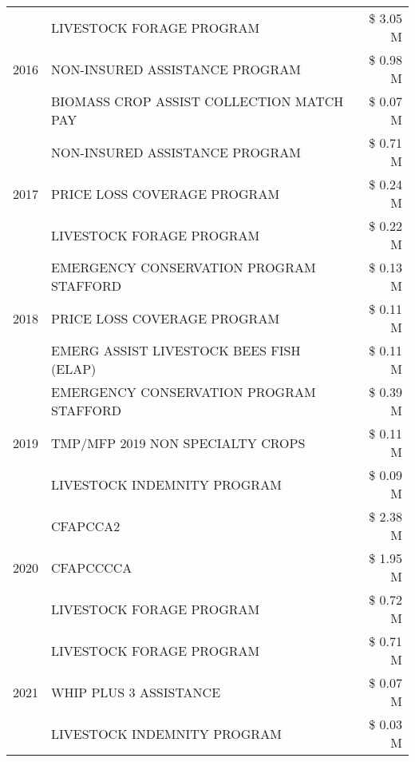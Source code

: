 \begin{tabular}{llr}
\multirow[t]{3}{*}{2016} & LIVESTOCK FORAGE PROGRAM                      & \$ 3.05 M \\
 & NON-INSURED ASSISTANCE PROGRAM                & \$ 0.98 M \\
 & BIOMASS CROP ASSIST COLLECTION MATCH PAY      & \$ 0.07 M \\
\cline{1-3}
\multirow[t]{3}{*}{2017} & NON-INSURED ASSISTANCE PROGRAM & \$ 0.71 M \\
 & PRICE LOSS COVERAGE PROGRAM & \$ 0.24 M \\
 & LIVESTOCK FORAGE PROGRAM & \$ 0.22 M \\
\cline{1-3}
\multirow[t]{3}{*}{2018} & EMERGENCY CONSERVATION PROGRAM STAFFORD & \$ 0.13 M \\
 & PRICE LOSS COVERAGE PROGRAM & \$ 0.11 M \\
 & EMERG ASSIST LIVESTOCK BEES FISH (ELAP) & \$ 0.11 M \\
\cline{1-3}
\multirow[t]{3}{*}{2019} & EMERGENCY CONSERVATION PROGRAM STAFFORD & \$ 0.39 M \\
 & TMP/MFP 2019 NON SPECIALTY CROPS & \$ 0.11 M \\
 & LIVESTOCK INDEMNITY PROGRAM & \$ 0.09 M \\
\cline{1-3}
\multirow[t]{3}{*}{2020} & CFAPCCA2 & \$ 2.38 M \\
 & CFAPCCCCA & \$ 1.95 M \\
 & LIVESTOCK FORAGE PROGRAM & \$ 0.72 M \\
\cline{1-3}
\multirow[t]{3}{*}{2021} & LIVESTOCK FORAGE PROGRAM & \$ 0.71 M \\
 & WHIP PLUS 3 ASSISTANCE & \$ 0.07 M \\
 & LIVESTOCK INDEMNITY PROGRAM & \$ 0.03 M \\
\cline{1-3}
\bottomrule
\end{tabular}
